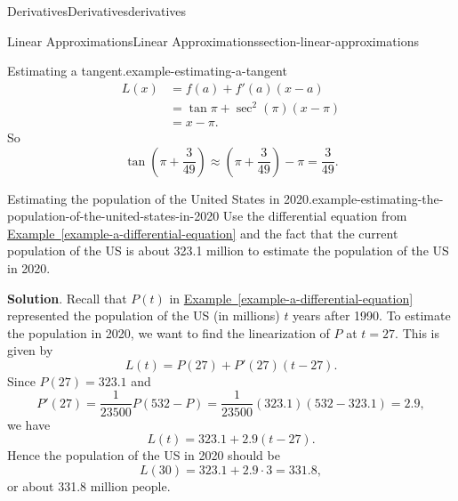 \documentclass[oneside,10pt,]{book}
\numberwithin{equation}{section}
\begin{document}
\begin{chapterptx}{Derivatives}{}{Derivatives}{}{}{derivatives}
\begin{sectionptx}{Linear Approximations}{}{Linear Approximations}{}{}{section-linear-approximations}
\begin{example}{Estimating a tangent.}{example-estimating-a-tangent}
\begin{align*}
L(x) & = f(a) + f'(a)(x-a)\\
& = \tan\pi + \sec^{2}(\pi)(x-\pi) \\
& = x-\pi. 
\end{align*}
So%
\begin{equation*}
\tan(\pi+\frac{3}{49}) \approx (\pi+\frac{3}{49}) - \pi = \frac{3}{49}.
\end{equation*}
%
\end{example}
\begin{example}{Estimating the population of the United States in 2020.}{example-estimating-the-population-of-the-united-states-in-2020}%
\hypertarget{p-183}{}%
Use the differential equation from \hyperref[example-a-differential-equation]{Example~\ref{example-a-differential-equation}} and the fact that the current population of the US is about 323.1 million to estimate the population of the US in 2020.%
\par\smallskip%
\noindent\textbf{Solution}.\hypertarget{solution-41}{}\quad%
\hypertarget{p-184}{}%
Recall that \(P(t)\) in \hyperref[example-a-differential-equation]{Example~\ref{example-a-differential-equation}} represented the population of the US (in millions) \(t\) years after 1990. To estimate the population in 2020, we want to find the linearization of \(P\) at \(t = 27\). This is given by%
\begin{equation*}
L(t) = P(27) + P'(27)(t - 27).
\end{equation*}
Since \(P(27) = 323.1\) and%
\begin{equation*}
P'(27) = \frac{1}{23500}P(532-P) = \frac{1}{23500}(323.1)(532-323.1) = 2.9,
\end{equation*}
we have%
\begin{equation*}
L(t) = 323.1 + 2.9(t-27).
\end{equation*}
Hence the population of the US in 2020 should be%
\begin{equation*}
L(30) = 323.1 + 2.9\cdot3 = 331.8,
\end{equation*}
or about 331.8 million people.%
\end{example}
\end{sectionptx}
\end{chapterptx}
%
%
\typeout{************************************************}
\typeout{************************************************}
%
\end{document}
